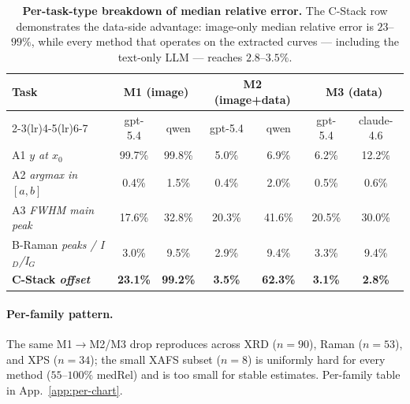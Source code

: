 \documentclass{article}
\begin{document}
\begin{table}[t]
\centering
\caption{\textbf{Per-task-type breakdown of median relative error.}
The C-Stack row demonstrates the data-side advantage: image-only
median relative error is $23$–$99\%$, while every method that
operates on the extracted curves --- including the text-only LLM
--- reaches $2.8$–$3.5\%$.}
\label{tab:mr-rigorous-by-task}
\small
\begin{tabular}{lcccccc}
\toprule
\multirow{2}{*}{Task} &
\multicolumn{2}{c}{M1 (image)} &
\multicolumn{2}{c}{M2 (image+data)} &
\multicolumn{2}{c}{M3 (data)} \\
\cmidrule(lr){2-3}\cmidrule(lr){4-5}\cmidrule(lr){6-7}
& gpt-5.4 & qwen & gpt-5.4 & qwen & gpt-5.4 & claude-4.6 \\
\midrule
A1 \emph{$y$ at $x_{0}$}        & 99.7\%  & 99.8\%  & 5.0\%  & 6.9\%  & 6.2\%  & 12.2\% \\
A2 \emph{argmax in $[a,b]$}     &  0.4\%  &  1.5\%  & 0.4\%  & 2.0\%  & 0.5\%  &  0.6\% \\
A3 \emph{FWHM main peak}        & 17.6\%  & 32.8\%  & 20.3\% & 41.6\% & 20.5\% & 30.0\% \\
B-Raman \emph{peaks / I${}_D$/I${}_G$}      &  3.0\%  &  9.5\%  & 2.9\%  & 9.4\%  & 3.3\%  &  9.4\% \\
\textbf{C-Stack \emph{offset}}  & \textbf{23.1\%} & \textbf{99.2\%} & \textbf{3.5\%} & \textbf{62.3\%} & \textbf{3.1\%} & \textbf{2.8\%} \\
\bottomrule
\end{tabular}
\end{table}

\paragraph{Per-family pattern.}
The same M1$\to$M2/M3 drop reproduces across XRD ($n{=}90$), Raman
($n{=}53$), and XPS ($n{=}34$); the small XAFS subset ($n{=}8$) is
uniformly hard for every method ($55\text{--}100\%$ medRel) and is
too small for stable estimates. Per-family table in
App.~\ref{app:per-chart}.
\end{document}
